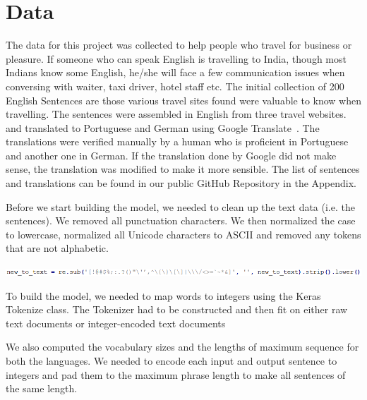 \documentclass[runningheads]{llncs}
\begin{document}
	\section{Data}
	The data for this project was collected to help people who travel for business or pleasure.  If someone who can speak English is travelling to India, though most Indians know some English, he/she will face a few communication issues when conversing with waiter, taxi driver, hotel staff etc. The initial collection of 200 English Sentences are those various travel sites found were valuable to know when travelling. The sentences were assembled in English from three travel websites.~\cite{ref_url11,ref_url12,ref_url13} and translated to Portuguese and German using Google Translate~\cite{ref_url14}. The translations were verified manually by a human who is proficient in Portuguese and another one in German. If the translation done by Google did not make sense, the translation was modified to make it more sensible. The list of sentences and translations can be found in our public GitHub Repository in the Appendix.
	
	Before we start building the model, we needed to clean up the text data (i.e. the sentences). We removed all punctuation characters. We then normalized the case to lowercase, normalized all Unicode characters to ASCII and removed any tokens that are not alphabetic. 
\newline

	\begin{minipage}{\linewidth}
		\begin{center}
			\hspace*{-.3in}
			\hspace*{-.3in}
			\includegraphics[width=\textwidth]{Text_Cleanup.png}
			\label{fig:Text Cleanup Code}
			\vspace*{1cm}
		\end{center}
	\end{minipage}
	\afterpage{\clearpage}

To build the model, we needed to map words to integers  using the Keras Tokenize class. The Tokenizer had to be constructed and then fit on either raw text documents or integer-encoded text documents
	
	We also computed the vocabulary sizes and the lengths of maximum sequence for both the languages. We needed to encode each input and output sentence to integers and pad them to the maximum phrase length to make all sentences of the same length. 
	
\end{document}
